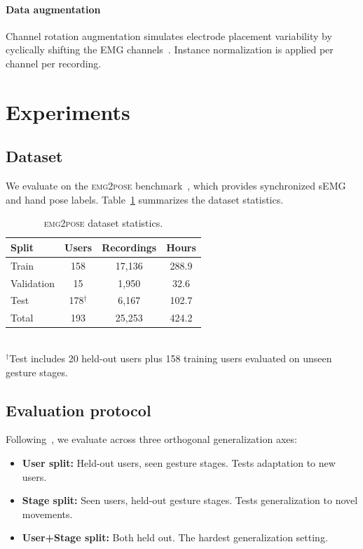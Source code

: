 \documentclass[conference]{IEEEtran}
\begin{document}
\paragraph{Data augmentation}
Channel rotation augmentation simulates electrode placement variability by cyclically shifting the EMG channels~\cite{salter2024emg2pose}. Instance normalization is applied per channel per recording.

\section{Experiments}
\label{sec:experiments}

\subsection{Dataset}
\label{sec:dataset}

We evaluate on the \textsc{emg2pose} benchmark~\cite{salter2024emg2pose}, which provides synchronized sEMG and hand pose labels. Table~\ref{tab:dataset} summarizes the dataset statistics.

\begin{table}[h]
\centering
\caption{\textsc{emg2pose} dataset statistics.}
\label{tab:dataset}
\small
\begin{tabular}{lccc}
\toprule
\textbf{Split} & \textbf{Users} & \textbf{Recordings} & \textbf{Hours} \\
\midrule
Train & 158 & 17{,}136 & 288.9 \\
Validation & 15 & 1{,}950 & 32.6 \\
Test & 178$^\dagger$ & 6{,}167 & 102.7 \\
\midrule
Total & 193 & 25{,}253 & 424.2 \\
\bottomrule
\end{tabular}
\\[3pt]
{\footnotesize $^\dagger$Test includes 20 held-out users plus 158 training users evaluated on unseen gesture stages.}
\end{table}

\subsection{Evaluation protocol}
\label{sec:eval_protocol}

Following~\cite{salter2024emg2pose}, we evaluate across three orthogonal generalization axes:
\begin{itemize}[leftmargin=*,itemsep=1pt,topsep=2pt]
    \item \textbf{User split:} Held-out users, seen gesture stages. Tests adaptation to new users.
    \item \textbf{Stage split:} Seen users, held-out gesture stages. Tests generalization to novel movements.
    \item \textbf{User+Stage split:} Both held out. The hardest generalization setting.
\end{itemize}
\end{document}
